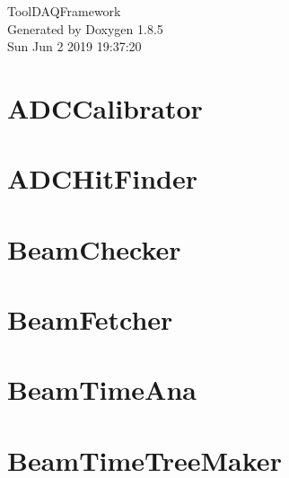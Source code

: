 \documentclass[twoside]{book}
\newcommand{\clearemptydoublepage}{%
  \newpage{\pagestyle{empty}\cleardoublepage}%
}
\begin{document}
\hypersetup{pageanchor=false}
\begin{titlepage}
\vspace*{7cm}
\begin{center}%
{\Large Tool\-D\-A\-Q\-Framework }\\
\vspace*{1cm}
{\large Generated by Doxygen 1.8.5}\\
\vspace*{0.5cm}
{\small Sun Jun 2 2019 19:37:20}\\
\end{center}
\end{titlepage}
\clearemptydoublepage
\tableofcontents
\clearemptydoublepage
{}
\hypersetup{pageanchor=true}

\chapter{A\-D\-C\-Calibrator}
\label{md_UserTools_ADCCalibrator_README}
\hypertarget{md_UserTools_ADCCalibrator_README}{}

\chapter{A\-D\-C\-Hit\-Finder}
\label{md_UserTools_ADCHitFinder_README}
\hypertarget{md_UserTools_ADCHitFinder_README}{}

\chapter{Beam\-Checker}
\label{md_UserTools_BeamChecker_README}
\hypertarget{md_UserTools_BeamChecker_README}{}

\chapter{Beam\-Fetcher}
\label{md_UserTools_BeamFetcher_README}
\hypertarget{md_UserTools_BeamFetcher_README}{}

\chapter{Beam\-Time\-Ana}
\label{md_UserTools_BeamTimeAna_README}
\hypertarget{md_UserTools_BeamTimeAna_README}{}

\chapter{Beam\-Time\-Tree\-Maker}
\label{md_UserTools_BeamTimeTreeMaker_README}
\hypertarget{md_UserTools_BeamTimeTreeMaker_README}{}

\end{document}

